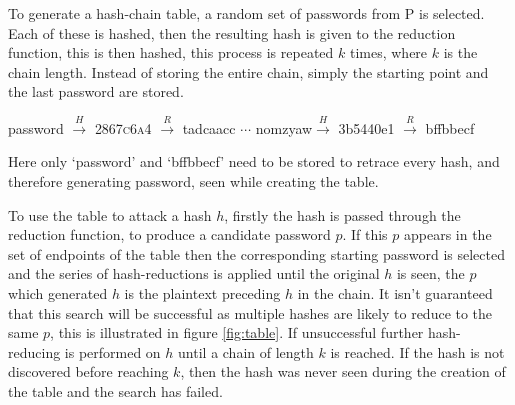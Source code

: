 \documentclass[a4paper,12pt]{article}
\begin{document}
To generate a hash-chain table\cite{Hellman1980}, a random set of passwords from P is selected. Each of these is hashed, then the resulting hash is given to the reduction function, this is then hashed, this process is repeated $k$ times, where $k$ is the chain length. Instead of storing the entire chain, simply the starting point and the last password are stored. 
\begin{center}
    password $\xrightarrow{H}$ \textsc{2867c6a4} $\xrightarrow{R}$ tadcaacc $\cdots$ nomzyaw$\xrightarrow{H}$ 3b5440e1 $\xrightarrow{R}$ bffbbecf
\end{center}
Here only `password' and `bffbbecf' need to be stored to retrace every hash, and therefore generating password, seen while creating the table.

To use the table to attack a hash $h$, firstly the hash is passed through the reduction function, to produce a candidate password $p$. If this $p$ appears in the set of endpoints of the table then the corresponding starting password is selected and the series of hash-reductions is applied until the original $h$ is seen, the $p$ which generated $h$ is the plaintext preceding $h$ in the chain. 
It isn't guaranteed that this search will be successful as multiple hashes are likely to reduce to the same $p$, this is illustrated in figure \ref{fig:table}. If unsuccessful further hash-reducing is performed on $h$ until a chain of length $k$ is reached. If the hash is not discovered before reaching $k$, then the hash was never seen during the creation of the table and the search has failed.
\end{document}
